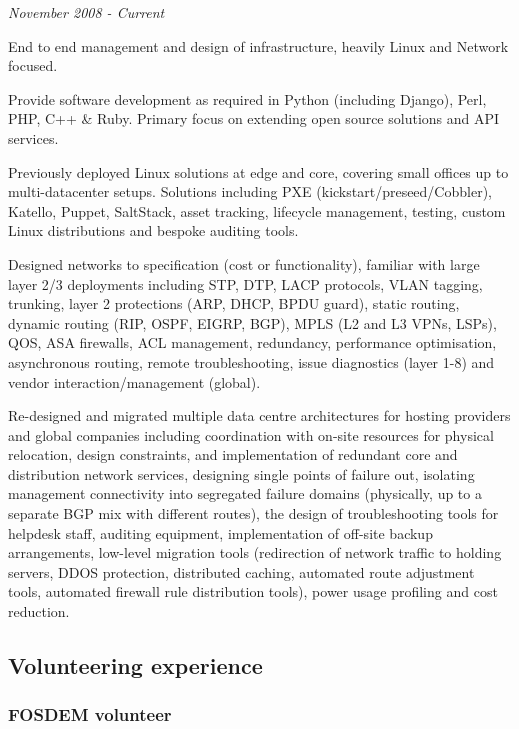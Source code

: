 \emph{November 2008 - Current}

End to end management and design of infrastructure, heavily Linux and
Network focused.

Provide software development as required in Python (including Django),
Perl, PHP, C++ \& Ruby. Primary focus on extending open source solutions
and API services.

Previously deployed Linux solutions at edge and core, covering small
offices up to multi-datacenter setups. Solutions including PXE
(kickstart/preseed/Cobbler), Katello, Puppet, SaltStack, asset tracking,
lifecycle management, testing, custom Linux distributions and bespoke
auditing tools.

Designed networks to specification (cost or functionality), familiar
with large layer 2/3 deployments including STP, DTP, LACP protocols,
VLAN tagging, trunking, layer 2 protections (ARP, DHCP, BPDU guard),
static routing, dynamic routing (RIP, OSPF, EIGRP, BGP), MPLS (L2 and L3
VPNs, LSPs), QOS, ASA firewalls, ACL management, redundancy, performance
optimisation, asynchronous routing, remote troubleshooting, issue
diagnostics (layer 1-8) and vendor interaction/management (global).

Re-designed and migrated multiple data centre architectures for hosting
providers and global companies including coordination with on-site
resources for physical relocation, design constraints, and
implementation of redundant core and distribution network services,
designing single points of failure out, isolating management
connectivity into segregated failure domains (physically, up to a
separate BGP mix with different routes), the design of troubleshooting
tools for helpdesk staff, auditing equipment, implementation of off-site
backup arrangements, low-level migration tools (redirection of network
traffic to holding servers, DDOS protection, distributed caching,
automated route adjustment tools, automated firewall rule distribution
tools), power usage profiling and cost reduction.

\subsection{Volunteering experience}\label{volunteering-experience}

\subsubsection{FOSDEM volunteer}\label{fosdem-volunteer}

